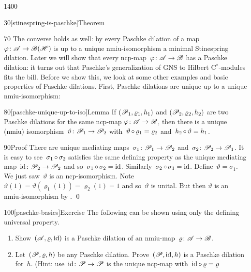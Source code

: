 \begin{parsec}{1400}
\begin{point}{30}[stinespring-is-paschke]{Theorem}
\begin{point}{70}%
The converse holds as well:
    by 
    every Paschke dilation of a map~$\varphi \colon \mathscr{A} \to \mathscr{B}(\mathscr{H})$
    is up to a unique nmiu-isomorphism a minimal Stinespring dilation.
Later we will show that
    every ncp-map~$\varphi\colon \mathscr{A} \to \mathscr{B}$
    has a Paschke dilation:
    it turns out that Paschke's generalization of
    GNS to Hilbert C$^*$-modules fits the bill.
Before we show this,
    we look at some other examples and basic properties
        of Paschke dilations.
First, Paschke dilations are unique up to a unique nmiu-isomorphism:
\par
\end{point}
\end{point}
\begin{point}{80}[paschke-unique-up-to-iso]{Lemma}%
If $(\mathscr{P}_1, \varrho_1, h_1)$
and $(\mathscr{P}_2, \varrho_2, h_2)$
    are two Paschke dilations for 
    the same ncp-map $\varphi\colon \mathscr{A} \to \mathscr{B}$,
    then there is a unique (nmiu)
    isomorphism~$\vartheta \colon \mathscr{P}_1 \to \mathscr{P}_2$
    with~$\vartheta \mathop{\circ} \varrho_1 = \varrho_2$
    and~$h_2 \mathop{\circ} \vartheta = h_1$.
\begin{point}{90}{Proof}%
There are unique mediating maps~$\sigma_1\colon \mathscr{P}_1 \to \mathscr{P}_2$
and~$\sigma_2 \colon \mathscr{P}_2 \to \mathscr{P}_1$.
It is easy to see~$\sigma_1 \mathop{\circ} \sigma_2$
satisfies the same defining property
as the unique mediating map~$\mathrm{id}\colon \mathscr{P}_2 \to \mathscr{P}_2$
and so~$\sigma_1 \mathop{\circ} \sigma_2 = \mathrm{id}$.
Similarly~$\sigma_2 \mathop{\circ} \sigma_1 = \mathrm{id}$.
Define~$\vartheta = \sigma_1$.
We just saw~$\vartheta$ is an ncp-isomorphism.
Note~$\vartheta(1) = \vartheta(\varrho_1(1)) = \varrho_2(1) = 1$
and so~$\vartheta$ is unital.
But then
    $\vartheta$ is an nmiu-isomorphism
    by . \qed
\par
\end{point}
\end{point}
\begin{point}{100}[paschke-basics]{Exercise}%
The following can be shown using only the defining universal property.
\begin{enumerate}
\item
Show~$(\mathscr{A},\varrho,\mathrm{id})$ is a Paschke dilation of
    an nmiu-map~$\varrho\colon \mathscr{A} \to \mathscr{B}$.
\item
Let~$(\mathscr{P}, \varrho, h)$ be any Paschke dilation.
Prove~$(\mathscr{P}, \mathrm{id}, h)$ is a Paschke dilation for~$h$.
(Hint: use~$\mathrm{id}\colon \mathscr{P} \to \mathscr{P}$
is the unique ncp-map with~$\mathrm{id} \mathop{\circ} \varrho = \varrho$

\end{enumerate}
\end{point}
\end{parsec}
